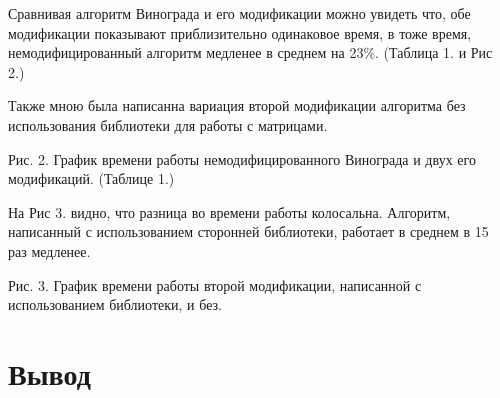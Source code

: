 \documentclass[12pt]{report}
\begin{document}
Сравнивая алгоритм Винограда и его модификации можно увидеть что, обе модификации показывают приблизительно одинаковое время, в тоже время,
немодифицированный алгоритм медленее в среднем на 23\%. (Таблица 1. и Рис 2.)

Также мною была написанна вариация второй модификации алгоритма без использования библиотеки для работы с матрицами.

\begin{center}

Рис. 2. График времени работы немодифицированного Винограда и двух его модификаций. (Таблице 1.)
\end{center}

На Рис 3. видно, что разница во времени работы колосальна.
Алгоритм, написанный с использованием сторонней библиотеки, работает в среднем в 15 раз медленее.

\begin{center}

Рис. 3. График времени работы второй модификации, написанной с использованием библиотеки, и без.
\end{center}

\chapter*{Вывод}
\end{document}
